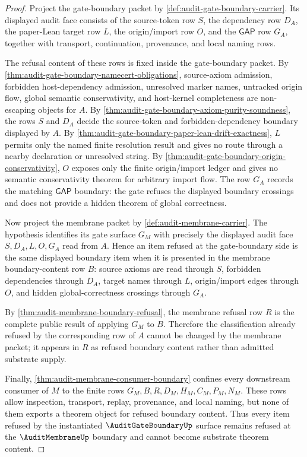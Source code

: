 \begin{proof}
Project the gate-boundary packet by \autoref{def:audit-gate-boundary-carrier}. Its displayed audit face consists of the source-token row $S$, the dependency row $D_A$, the paper-Lean target row $L$, the origin/import row $O$, and the $\mathsf{GAP}$ row $G_A$, together with transport, continuation, provenance, and local naming rows.

The refusal content of these rows is fixed inside the gate-boundary packet. By \autoref{thm:audit-gate-boundary-namecert-obligations}, source-axiom admission, forbidden host-dependency admission, unresolved marker names, untracked origin flow, global semantic conservativity, and host-kernel completeness are non-escaping objects for $A$. By \autoref{thm:audit-gate-boundary-axiom-purity-soundness}, the rows $S$ and $D_A$ decide the source-token and forbidden-dependency boundary displayed by $A$. By \autoref{thm:audit-gate-boundary-paper-lean-drift-exactness}, $L$ permits only the named finite resolution result and gives no route through a nearby declaration or unresolved string. By \autoref{thm:audit-gate-boundary-origin-conservativity}, $O$ exposes only the finite origin/import ledger and gives no semantic conservativity theorem for arbitrary import flow. The row $G_A$ records the matching $\mathsf{GAP}$ boundary: the gate refuses the displayed boundary crossings and does not provide a hidden theorem of global correctness.

Now project the membrane packet by \autoref{def:audit-membrane-carrier}. The hypothesis identifies its gate surface $G_M$ with precisely the displayed audit face $S,D_A,L,O,G_A$ read from $A$. Hence an item refused at the gate-boundary side is the same displayed boundary item when it is presented in the membrane boundary-content row $B$: source axioms are read through $S$, forbidden dependencies through $D_A$, target names through $L$, origin/import edges through $O$, and hidden global-correctness crossings through $G_A$.

By \autoref{thm:audit-membrane-boundary-refusal}, the membrane refusal row $R$ is the complete public result of applying $G_M$ to $B$. Therefore the classification already refused by the corresponding row of $A$ cannot be changed by the membrane packet; it appears in $R$ as refused boundary content rather than admitted substrate supply.

Finally, \autoref{thm:audit-membrane-consumer-boundary} confines every downstream consumer of $M$ to the finite rows $G_M,B,R,D_M,H_M,C_M,P_M,N_M$. These rows allow inspection, transport, replay, provenance, and local naming, but none of them exports a theorem object for refused boundary content. Thus every item refused by the instantiated $\AuditGateBoundaryUp$ surface remains refused at the $\AuditMembraneUp$ boundary and cannot become substrate theorem content.
\end{proof}

